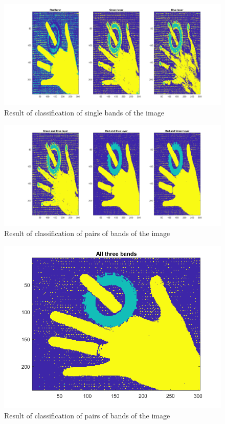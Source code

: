\documentclass[12pt]{article}
\begin{document}
\begin{figure}
  \centering
  \includegraphics[width = 15cm]{images/Q4_1b.png}
  \caption{Result of classification of single bands of the image}
  \label{fig:Q4_1}
\end{figure}

\begin{figure}
  \centering
  \includegraphics[width = 15cm]{images/Q4_2b.png}
  \caption{Result of classification of pairs of bands of the image}
  \label{fig:Q4_2}
\end{figure}

\begin{figure}
  \centering
  \includegraphics[width = 15cm]{images/Q4_3b.png}
  \caption{Result of classification of pairs of bands of the image}
  \label{fig:Q4_3}
\end{figure}
\end{document}
